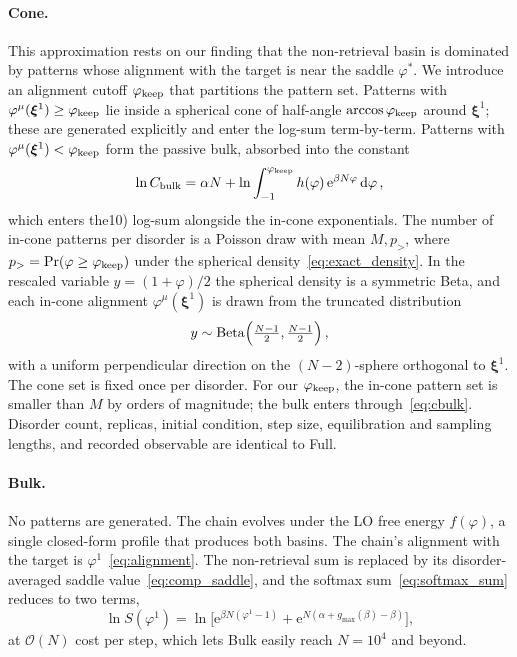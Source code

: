 \documentclass[letterpaper]{article} %
\newcommand{\bxi}{\boldsymbol{\xi}}
\newcommand{\e}{{\mathrm{e}}}
\newcommand{\dd}{{\mathrm{d}}}
\newcommand{\Bnet}{\beta}
\newcommand{\gmax}{g_{\max}}
\begin{document}
\paragraph{Cone.}
This approximation rests on our finding that the non-retrieval basin is dominated by patterns whose alignment with the target is near the saddle $\varphi^*$. We introduce an alignment cutoff $\varphi_{\rm keep}$ that partitions the pattern set. Patterns with $\varphi^\mu(\bxi^1) \geq \varphi_{\rm keep}$ lie inside a spherical cone of half-angle $\arccos \varphi_{\rm keep}$ around $\bxi^1$; these are generated explicitly and enter the log-sum term-by-term. Patterns with $\varphi^\mu(\bxi^1) < \varphi_{\rm keep}$ form the passive bulk, absorbed into the constant
\begin{equation}
    \ln C_{\rm bulk} = \alpha N + \ln\int_{-1}^{\varphi_{\rm keep}} h(\varphi)\,\e^{\Bnet N \varphi}\,\dd\varphi\,,
    \label{eq:cbulk}
\end{equation}
which enters the10) log-sum alongside the in-cone exponentials. The number of in-cone patterns per disorder is a Poisson draw with mean $M,p_{>}$, where $p_{>} = \Pr(\varphi \geq \varphi_{\rm keep})$ under the spherical density~\eqref{eq:exact_density}. In the rescaled variable $y = (1 + \varphi)/2$ the spherical density is a symmetric Beta, and each in-cone alignment $\varphi^\mu(\bxi^1)$ is drawn from the truncated distribution
\begin{equation}
    y \sim \mathrm{Beta} \Bigl(\tfrac{N-1}{2}, \tfrac{N-1}{2}\Bigr)\,,
    \label{eq:beta-tail}
\end{equation}
with a uniform perpendicular direction on the $(N{-}2)$-sphere orthogonal to $\bxi^1$. The cone set is fixed once per disorder. For our $\varphi_{\rm keep}$, the in-cone pattern set is smaller than $M$ by orders of magnitude; the bulk enters through~\eqref{eq:cbulk}. Disorder count, replicas, initial condition, step size, equilibration and sampling lengths, and recorded observable are identical to Full. 

\paragraph{Bulk.}
No patterns are generated. The chain evolves under the LO free energy $f(\varphi)$, a single closed-form profile that produces both basins. The chain's alignment with the target is $\varphi^1$~\eqref{eq:alignment}. The non-retrieval sum is replaced by its disorder-averaged saddle value~\eqref{eq:comp_saddle}, and the softmax sum~\eqref{eq:softmax_sum} reduces to two terms,
\begin{equation}
	\ln S(\varphi^1) = \ln \bigl[\e^{\Bnet N(\varphi^1 - 1)} + \e^{N(\alpha + \gmax(\Bnet) - \Bnet)}\bigr],
	\label{eq:bulk-logS}
\end{equation}
at $\mathcal{O}(N)$ cost per step, which lets Bulk easily reach $N = 10^4$ and beyond.
\end{document}
